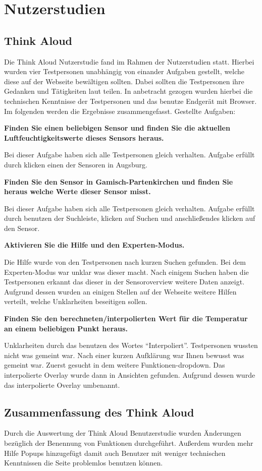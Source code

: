 \section{Nutzerstudien}
\subsection{Think Aloud}
Die Think Aloud Nutzerstudie fand im Rahmen der Nutzerstudien statt. Hierbei wurden vier Testpersonen unabhängig von einander Aufgaben gestellt,
welche diese auf der Webseite bewältigen sollten. Dabei sollten die Testpersonen ihre Gedanken und Tätigkeiten laut teilen.
In anbetracht gezogen wurden hierbei die technischen Kenntnisse der Testpersonen und das benutze Endgerät mit Browser. Im folgenden werden die Ergebnisse zusammengefasst.
Gestellte Aufgaben:

\textbf{Finden Sie einen beliebigen Sensor und finden Sie die aktuellen Luftfeuchtigkeitswerte dieses Sensors heraus.}

Bei dieser Aufgabe haben sich alle Testpersonen gleich verhalten. 
Aufgabe erfüllt durch klicken einen der Sensoren in Augsburg.

\textbf{Finden Sie den Sensor in Gamisch-Partenkirchen und finden Sie heraus welche Werte dieser Sensor misst.}

Bei dieser Aufgabe haben sich alle Testpersonen gleich verhalten. 
Aufgabe erfüllt durch benutzen der Suchleiste, klicken auf Suchen und anschließendes klicken auf den Sensor.

\textbf{Aktivieren Sie die Hilfe und den Experten-Modus.}

Die Hilfe wurde von den Testpersonen nach kurzen Suchen gefunden.
Bei dem Experten-Modus war unklar was dieser macht. Nach einigem Suchen haben die Testpersonen erkannt das dieser in der Sensoroverview weitere Daten anzeigt.
Aufgrund dessen wurden an einigen Stellen auf der Webseite weitere Hilfen verteilt, welche Unklarheiten beseitigen sollen. 

\textbf{Finden Sie den berechneten/interpolierten Wert für die Temperatur an einem beliebigen Punkt heraus.}

Unklarheiten durch das benutzen des Wortes \enquote{Interpoliert}. Testpersonen wussten nicht was gemeint war. Nach einer kurzen Aufklärung war Ihnen bewusst
was gemeint war. 
Zuerst gesucht in dem weitere Funktionen-dropdown. Das interpolierte Overlay wurde dann in Ansichten gefunden.
Aufgrund dessen wurde das interpolierte Overlay umbenannt. 

\subsection{Zusammenfassung des Think Aloud}
Durch die Auswertung der Think Aloud Benutzerstudie wurden Änderungen bezüglich der Benennung von Funktionen durchgeführt. Außerdem wurden mehr Hilfe Popups hinzugefügt damit auch Benutzer mit weniger
technischen Kenntnissen die Seite problemlos benutzen können.

